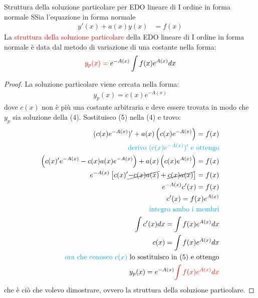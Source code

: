 \documentclass{article}  %
\begin{document}
\begin{theorem}{Struttura della soluzione particolare per EDO lineare di I ordine in forma normale}
	SSia l'equazione in forma normale
	\begin{align}
		y'(x)+a(x)y(x) & = f(x)
	\end{align}
	La \textcolor{red}{struttura della soluzione particolare} della EDO lineare di I ordine in forma normale è data dal metodo di variazione di una costante nella forma:
	\begin{align*}
		\textcolor{red}{y_p(x) = } \; e^{-A(x)}\int f(x)e^{A(x)}dx
	\end{align*}
	\begin{proof}
		La soluzione particolare viene cercata nella forma:
		\begin{align}
			y_p(x)=c(x)e^{-A(x)}
		\end{align}
		dove $c(x)$ non è più una costante arbitraria e deve essere trovata in modo che $y_p$ sia soluzione della (4). Sostituisco (5) nella (4) e trovo:
		\begin{align*}
			(c(x)e^{-A(x)})'+a(x)\left(c(x)e^{-A(x)}\right)=f(x)                                \\
			\text{\textcolor{cyan}{derivo $(c(x)e^{-A(x)})'$  e ottengo}}                       \\
			\left(c(x)'e^{-A(x)} - c(x)a(x)e^{-A(x)} \right)+a(x)\left(c(x)e^{A(x)}\right)=f(x) \\
			e^{-A(x)}\left[c(x)' \cancel{- c(x)a(x)} + \cancel{c(x)a(x)}\right]=f(x)            \\
			e^{-A(x)}c'(x) = f(x)                                                               \\
			c'(x) = f(x)e^{A(x)}                                                                \\
			\text{\textcolor{cyan}{integro ambo i membri}}                                      \\
			\int c'(x) dx = \int f(x)e^{A(x)} dx                                                \\
			c(x) = \int f(x)e^{A(x)} dx                                                         \\
			\text{\textcolor{cyan}{ora che conosco $c(x)$} lo sostituisco in (5) e ottengo}     \\
			y_p(x)=e^{-A(x)}\textcolor{red}{\int f(x)e^{A(x)} dx}
		\end{align*}
		che è ciò che volevo dimostrare, ovvero la struttura della soluzione particolare.
	\end{proof}
\end{theorem}
\end{document}
